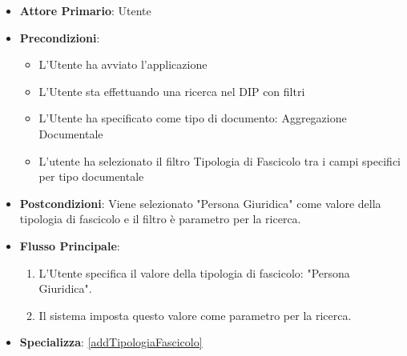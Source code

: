 \begin{itemize}
      \item \textbf{Attore Primario}: Utente
      \item \textbf{Precondizioni}: 
      \begin{itemize}            
            \item L'Utente ha avviato l'applicazione
            \item L'Utente sta effettuando una ricerca nel DIP con filtri
            \item L'Utente ha specificato come tipo di documento: Aggregazione Documentale
            \item L'utente ha selezionato il filtro Tipologia di Fascicolo tra i campi specifici per tipo documentale
      \end{itemize}
      \item \textbf{Postcondizioni}: Viene selezionato "Persona Giuridica" come valore della tipologia di fascicolo e il filtro è parametro per la ricerca.
      \item \textbf{Flusso Principale}:
            \begin{enumerate}
                  \item L'Utente specifica il valore della tipologia di fascicolo: "Persona Giuridica".
                  \item Il sistema imposta questo valore come parametro per la ricerca.
            \end{enumerate}
      \item \textbf{Specializza}: \ref{addTipologiaFascicolo}
\end{itemize}

